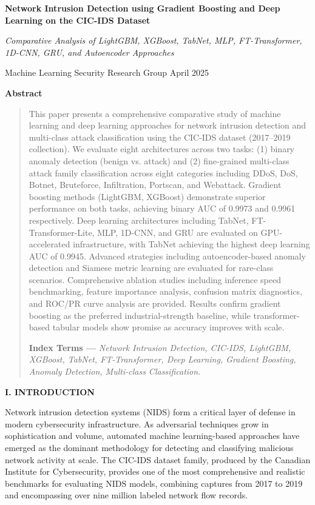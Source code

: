 \documentclass[
  journal,
  10pt]{IEEEtran}
\author{}
\date{}
\begin{document}
\textbf{Network Intrusion Detection using Gradient Boosting and Deep
Learning on the CIC-IDS Dataset}

\emph{Comparative Analysis of LightGBM, XGBoost, TabNet, MLP,
FT-Transformer, 1D-CNN, GRU, and Autoencoder Approaches}

Machine Learning Security Research Group \textbar{} April 2025

\textbf{Abstract}

\begin{quote}
This paper presents a comprehensive comparative study of machine
learning and deep learning approaches for network intrusion detection
and multi-class attack classification using the CIC-IDS dataset
(2017--2019 collection). We evaluate eight architectures across two
tasks: (1) binary anomaly detection (benign vs. attack) and (2)
fine-grained multi-class attack family classification across eight
categories including DDoS, DoS, Botnet, Bruteforce, Infiltration,
Portscan, and Webattack. Gradient boosting methods (LightGBM, XGBoost)
demonstrate superior performance on both tasks, achieving binary AUC of
0.9973 and 0.9961 respectively. Deep learning architectures including
TabNet, FT-Transformer-Lite, MLP, 1D-CNN, and GRU are evaluated on
GPU-accelerated infrastructure, with TabNet achieving the highest deep
learning AUC of 0.9945. Advanced strategies including autoencoder-based
anomaly detection and Siamese metric learning are evaluated for
rare-class scenarios. Comprehensive ablation studies including inference
speed benchmarking, feature importance analysis, confusion matrix
diagnostics, and ROC/PR curve analysis are provided. Results confirm
gradient boosting as the preferred industrial-strength baseline, while
transformer-based tabular models show promise as accuracy improves with
scale.

\textbf{Index Terms ---} \emph{Network Intrusion Detection, CIC-IDS,
LightGBM, XGBoost, TabNet, FT-Transformer, Deep Learning, Gradient
Boosting, Anomaly Detection, Multi-class Classification.}
\end{quote}

\textbf{I. INTRODUCTION}

Network intrusion detection systems (NIDS) form a critical layer of
defense in modern cybersecurity infrastructure. As adversarial
techniques grow in sophistication and volume, automated machine
learning-based approaches have emerged as the dominant methodology for
detecting and classifying malicious network activity at scale. The
CIC-IDS dataset family, produced by the Canadian Institute for
Cybersecurity, provides one of the most comprehensive and realistic
benchmarks for evaluating NIDS models, combining captures from 2017 to
2019 and encompassing over nine million labeled network flow records.
\end{document}
